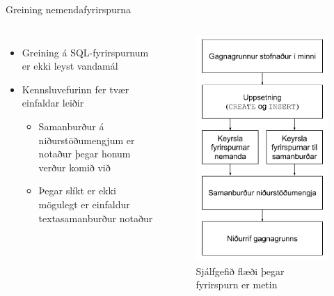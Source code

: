 \documentclass{beamer}
\begin{document}
\begin{frame}{Greining nemendafyrirspurna}
    \begin{columns}
        \begin{itemize}
        \item Greining á SQL-fyrirspurnum er ekki leyst vandamál
        \item Kennsluvefurinn fer tvær einfaldar leiðir
        \begin{itemize}
            \item Samanburður á niðurstöðumengjum er notaður þegar honum verður komið við
            \item Þegar slíkt er ekki mögulegt er einfaldur textasamanburður notaður
        \end{itemize}
    \end{itemize}
    \begin{figure}
        \caption{Sjálfgefið flæði þegar fyrirspurn er metin}
        \includegraphics[width=0.8\linewidth]{keyrsla-fyrirspurnar-lodrett}
    \end{figure}
    \end{columns}
\end{frame}
\end{document}
